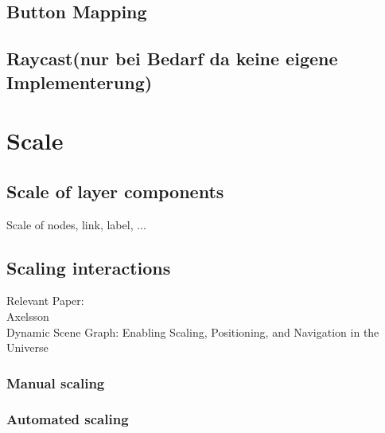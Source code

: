 \subsection{Button Mapping}
\subsection{Raycast(nur bei Bedarf da keine eigene Implementerung)}

\section{Scale}
\subsection{Scale of layer components}
Scale of nodes, link, label, ...
\subsection{Scaling interactions}

Relevant Paper: \\
Axelsson\\
Dynamic Scene Graph: Enabling Scaling, Positioning, and Navigation in the Universe

\subsubsection{Manual scaling}
\subsubsection{Automated scaling}
